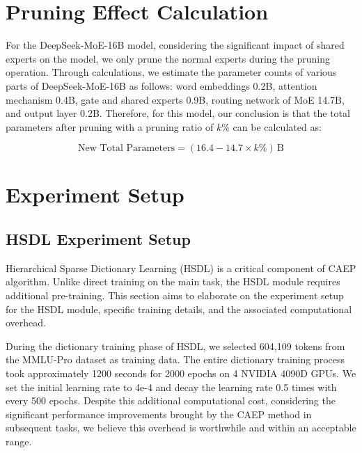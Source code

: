 \documentclass[11pt]{article}
\begin{document}


\section{Pruning Effect Calculation}
For the DeepSeek-MoE-16B model, considering the significant impact of shared experts on the model, we only prune the normal experts during the pruning operation. Through calculations, we estimate the parameter counts of various parts of DeepSeek-MoE-16B as follows: word embeddings 0.2B, attention mechanism 0.4B, gate and shared experts 0.9B, routing network of MoE 14.7B, and output layer 0.2B. Therefore, for this model, our conclusion is that the total parameters after pruning with a pruning ratio of \( k\% \) can be calculated as:

\begin{equation}
\text{New Total Parameters} = (16.4 - 14.7 \times k\%) \, \text{B}
\end{equation}

\section{Experiment Setup}
\subsection{HSDL Experiment Setup}
Hierarchical Sparse Dictionary Learning (HSDL) is a critical component of CAEP algorithm. Unlike direct training on the main task, the HSDL module requires additional pre-training. This section aims to elaborate on the experiment setup for the HSDL module, specific training details, and the associated computational overhead.

During the dictionary training phase of HSDL, we selected 604,109 tokens from the MMLU-Pro dataset as training data. The entire dictionary training process took approximately 1200 seconds for 2000 epochs on 4 NVIDIA 4090D GPUs. We set the initial learning rate to 4e-4 and decay the learning rate 0.5 times with every 500 epochs. 
Despite this additional computational cost, considering the significant performance improvements brought by the CAEP method in subsequent tasks, we believe this overhead is worthwhile and within an acceptable range. 
\end{document}
